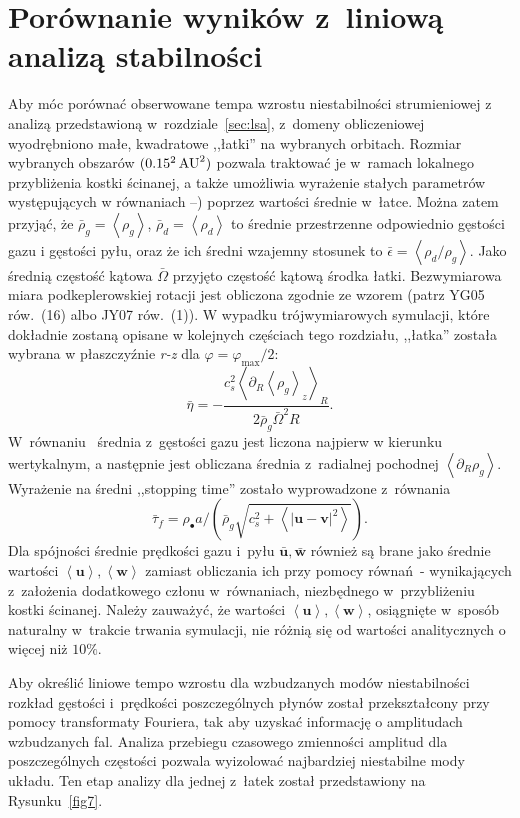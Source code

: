 \section{Porównanie wyników z~liniową analizą stabilności}
\label{sec:simulation_analysis}
Aby móc porównać obserwowane tempa wzrostu niestabilności strumieniowej z
analizą przedstawioną w~rozdziale~\ref{sec:lsa}, z~domeny obliczeniowej
wyodrębniono małe, kwadratowe ,,łatki'' na wybranych orbitach. Rozmiar wybranych
obszarów $(0.15^2\hbox{$\thinspace\textrm{AU}$}^2)$ pozwala traktować je w~ramach lokalnego przybliżenia
kostki ścinanej, a także umożliwia wyrażenie stałych parametrów występujących w
równaniach --) poprzez wartości średnie w~łatce.
Można zatem przyjąć, że $\bar{\rho}_g = \left<\rho_g\right>$, $\bar{\rho}_d =
\left<\rho_d\right>$ to średnie przestrzenne odpowiednio gęstości gazu i
gęstości pyłu, oraz że ich średni wzajemny stosunek to $\bar{\epsilon} =
\left<\rho_d / \rho_g\right>$. Jako średnią częstość kątowa $\bar{\Omega}$
przyjęto częstość kątową środka łatki. Bezwymiarowa miara podkeplerowskiej
rotacji jest obliczona zgodnie ze wzorem (patrz YG05 rów.~(16) albo JY07
rów.~(1)). W wypadku trójwymiarowych symulacji, które dokładnie zostaną opisane
w kolejnych częściach tego rozdziału, ,,łatka'' została wybrana w
płaszczyźnie {\it r-z} dla $\varphi = \varphi_\textrm{max} / 2$:
%
\begin{equation}
   \bar{\eta} = -\frac{c_s^2\left<\partial_R \left<\rho_g\right>_z\right>_R}
      {2\bar{\rho}_g\bar{\Omega}^2 R}.
   \label{eq:meaneta}
\end{equation}
%
W~równaniu~ średnia z~gęstości gazu jest liczona najpierw w
kierunku wertykalnym, a następnie jest obliczana średnia z~radialnej pochodnej 
$\left<\partial_R \rho_g\right>$. Wyrażenie na średni ,,stopping time'' zostało
wyprowadzone z~równania~
\begin{equation}
   \bar{\tau}_f = \rho_\bullet a / \left(\bar{\rho}_g \sqrt{c_s^2 +
   \left<\left|\mathbf{u} - \mathbf{v}\right|^2\right>} \right).
\end{equation}
%
Dla spójności średnie prędkości gazu i~pyłu $\bar{\mathbf{u}},
\bar{\mathbf{w}}$ również są brane jako średnie wartości
$\left<\mathbf{u}\right>, \left<\mathbf{w}\right>$ zamiast obliczania ich przy
pomocy równań~- wynikających z~założenia dodatkowego
członu w~równaniach, niezbędnego w~przybliżeniu kostki ścinanej. 
Należy zauważyć, że wartości $\left<\mathbf{u}\right>, \left<\mathbf{w}\right>$,
osiągnięte w~sposób naturalny w~trakcie trwania symulacji, nie różnią się od
wartości analitycznych o więcej niż $10\%$.
\par Aby określić liniowe tempo wzrostu dla wzbudzanych modów niestabilności
rozkład gęstości i~prędkości poszczególnych płynów został przekształcony przy
pomocy transformaty Fouriera, tak aby uzyskać informację o amplitudach
wzbudzanych fal. Analiza przebiegu czasowego zmienności amplitud dla
poszczególnych częstości pozwala wyizolować najbardziej niestabilne mody układu.
Ten etap analizy dla jednej z~łatek został przedstawiony na Rysunku~\ref{fig7}.

